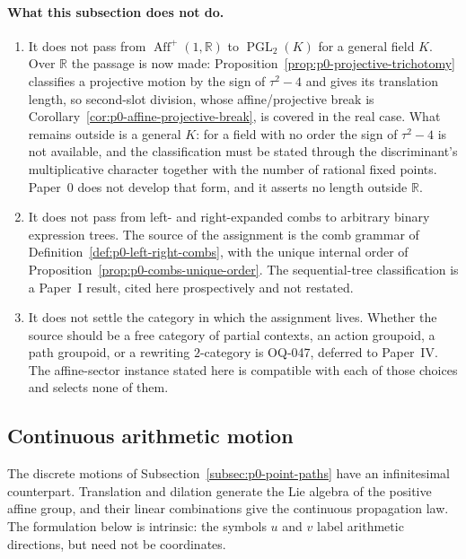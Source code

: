 \paragraph{What this subsection does not do.}
\begin{enumerate}
\item It does not pass from $\operatorname{Aff}^{+}(1,\mathbb R)$ to
  $\operatorname{PGL}_2(K)$ for a general field $K$.  Over $\mathbb R$ the passage is
  now made: Proposition~\ref{prop:p0-projective-trichotomy} classifies a projective
  motion by the sign of $\tau^2-4$ and gives its translation length, so second-slot
  division, whose affine/projective break is
  Corollary~\ref{cor:p0-affine-projective-break}, is covered in the real case.  What
  remains outside is a general $K$: for a field with no order the sign of
  $\tau^2-4$ is not available, and the classification must be stated through the
  discriminant's multiplicative character together with the number of rational fixed
  points.  Paper~0 does not develop that form, and it asserts no length outside
  $\mathbb R$.
\item It does not pass from left- and right-expanded combs to arbitrary binary
  expression trees.  The source of the assignment is the comb grammar of
  Definition~\ref{def:p0-left-right-combs}, with the unique internal order of
  Proposition~\ref{prop:p0-combs-unique-order}.  The sequential-tree classification
  is a Paper~I result, cited here prospectively and not restated.
\item It does not settle the category in which the assignment lives.  Whether the
  source should be a free category of partial contexts, an action groupoid, a path
  groupoid, or a rewriting $2$-category is OQ-047, deferred to Paper~IV.  The
  affine-sector instance stated here is compatible with each of those choices and
  selects none of them.
\end{enumerate}

\subsection{Continuous arithmetic motion}
\label{subsec:p0-continuous-motion}

The discrete motions of Subsection~\ref{subsec:p0-point-paths} have an
infinitesimal counterpart.  Translation and dilation generate the Lie algebra
of the positive affine group, and their linear combinations give the continuous
propagation law.  The formulation below is intrinsic: the symbols $u$ and $v$
label arithmetic directions, but need not be coordinates.

